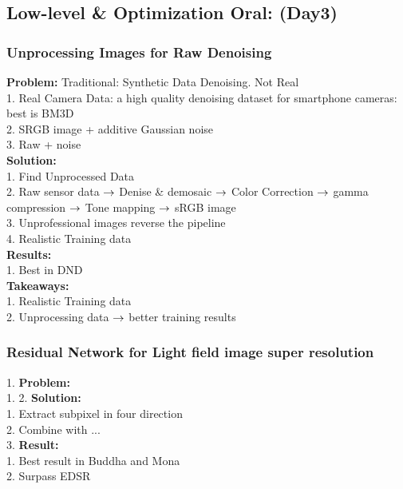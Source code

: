 \subsection{Low-level \& Optimization Oral: (Day3)}
\subsubsection{Unprocessing Images for Raw Denoising}
{\bf Problem:} Traditional: Synthetic Data Denoising. Not Real \\
        1. Real Camera Data: a high quality denoising dataset for smartphone cameras: best is BM3D \\
        2. SRGB image + additive Gaussian noise \\
        3. Raw + noise\\
{\bf Solution:} \\
        1. Find Unprocessed Data \\
        2. Raw sensor data $\rightarrow$ Denise \& demosaic $\rightarrow$ Color Correction $\rightarrow$ gamma compression $\rightarrow$ Tone mapping $\rightarrow$ sRGB image \\
        3. Unprofessional images reverse the pipeline \\
        4. Realistic Training data\\
{\bf Results:} \\
        1. Best in DND\\
{\bf Takeaways:} \\
        1. Realistic Training data \\
        2. Unprocessing data $\rightarrow$ better training results \\
\subsubsection{Residual Network for Light field image super resolution}
    1. {\bf Problem:} \\
        1. 
    2. {\bf Solution:} \\
        1. Extract subpixel in four direction \\
        2. Combine with ... \\
    3. {\bf Result:} \\
        1. Best result in Buddha and Mona \\
        2. Surpass EDSR \\

